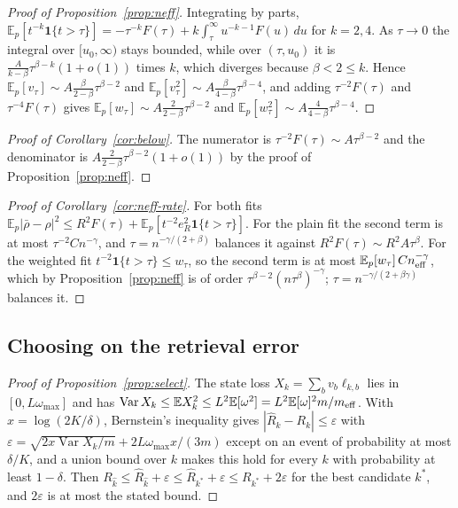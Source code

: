 \documentclass[11pt]{article}
\theoremstyle{remark}
\newcommand{\E}{\mathbb{E}}
\newcommand{\1}{\mathbf{1}}
\begin{document}
\begin{proof}[Proof of Proposition~\ref{prop:neff}]
Integrating by parts, $\E_p[t^{-k}\1\{t>\tau\}]=-\tau^{-k}F(\tau)+k\int_\tau^\infty u^{-k-1}F(u)\,du$ for $k=2,4$. As
$\tau\to0$ the integral over $[u_0,\infty)$ stays bounded, while over $(\tau,u_0)$ it is
$\frac{A}{k-\beta}\tau^{\beta-k}(1+o(1))$ times $k$, which diverges because $\beta<2\le k$. Hence
$\E_p[v_\tau]\sim A\frac{\beta}{2-\beta}\tau^{\beta-2}$ and $\E_p[v_\tau^2]\sim A\frac{\beta}{4-\beta}\tau^{\beta-4}$, and
adding $\tau^{-2}F(\tau)$ and $\tau^{-4}F(\tau)$ gives $\E_p[w_\tau]\sim A\frac{2}{2-\beta}\tau^{\beta-2}$ and
$\E_p[w_\tau^2]\sim A\frac{4}{4-\beta}\tau^{\beta-4}$.
\end{proof}

\begin{proof}[Proof of Corollary~\ref{cor:below}]
The numerator is $\tau^{-2}F(\tau)\sim A\tau^{\beta-2}$ and the denominator is $A\frac{2}{2-\beta}\tau^{\beta-2}(1+o(1))$
by the proof of Proposition~\ref{prop:neff}.
\end{proof}

\begin{proof}[Proof of Corollary~\ref{cor:neff-rate}]
For both fits $\E_p|\bar\rho-\rho|^2\le R^2F(\tau)+\E_p[t^{-2}e_R^2\1\{t>\tau\}]$. For the plain fit the second term is
at most $\tau^{-2}Cn^{-\gamma}$, and $\tau=n^{-\gamma/(2+\beta)}$ balances it against $R^2F(\tau)\sim R^2A\tau^\beta$.
For the weighted fit $t^{-2}\1\{t>\tau\}\le w_\tau$, so the second term is at most $\E_p[w_\tau]\,Cn_{\rm eff}^{-\gamma}$,
which by Proposition~\ref{prop:neff} is of order $\tau^{\beta-2}(n\tau^\beta)^{-\gamma}$; $\tau=n^{-\gamma/(2+\beta\gamma)}$
balances it.
\end{proof}

\subsection{Choosing on the retrieval error}

\begin{proof}[Proof of Proposition~\ref{prop:select}]
The state loss $X_k=\sum_bv_b\ell_{k,b}$ lies in $[0,L\omega_{\max}]$ and has
$\operatorname{Var}X_k\le\E X_k^2\le L^2\E[\omega^2]=L^2\E[\omega]^2m/m_{\rm eff}$. With $x=\log(2K/\delta)$, Bernstein's
inequality gives $|\hat R_k-R_k|\le\varepsilon$ with $\varepsilon=\sqrt{2x\operatorname{Var}X_k/m}+2L\omega_{\max}x/(3m)$
except on an event of probability at most $\delta/K$, and a union bound over $k$ makes this hold for every $k$ with
probability at least $1-\delta$. Then $R_{\hat k}\le\hat R_{\hat k}+\varepsilon\le\hat R_{k^\ast}+\varepsilon\le
R_{k^\ast}+2\varepsilon$ for the best candidate $k^\ast$, and $2\varepsilon$ is at most the stated bound.
\end{proof}
\end{document}
